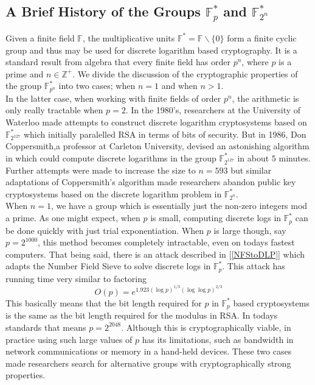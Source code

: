 \subsection{A Brief History of the Groups $\mathbb{F}_p^*$ and $\mathbb{F}_{2^n}^*$}

Given a finite field $\mathbb{F}$, the multiplicative units $\mathbb{F}^* = \mathbb{F} \backslash \lbrace 0 \rbrace $ form a finite cyclic group and thus may be used for discrete logarithm based cryptography. It is a standard result from algebra that every finite field has order $p^n$, where $p$ is a prime and $n \in \mathbb{Z}^+$. We divide the discussion of the cryptographic properties of the group $\mathbb{F}_{p^n}^*$ into two cases; when $n = 1$ and when $n>1$. \\

In the latter case, when working with finite fields of order $p^n$, the arithmetic is only really tractable when $p=2$. In the 1980's, researchers at the University of Waterloo made attempts to construct discrete logarithm cryptosystems based on $\mathbb{F}_{2^{127}}^*$ which initially paralelled RSA in terms of bits of security. But in 1986, Don Coppersmith,a professor at Carleton University, devised an astonishing algorithm in which could compute discrete logarithms in the group $\mathbb{F}_{2^{127}}^*$ in about $5$ minutes. Further attempts were made to increase the size to $n=593$ but similar adaptations of Coppersmith's algorithm made researchers abandon public key cryptosystems based on the discrete logarithm problem in $\mathbb{F}_{2^n}^*$. \\

When $n = 1$, we have a group which is essentially just the non-zero integers mod a prime. As one might expect, when $p$ is small, computing discrete logs in $\mathbb{F}_p^*$ can be done quickly with just trial exponentiation. When $p$ is large though, say $p = 2^{1000}$, this method becomes completely intractable, even on todays fastest computers. That being said, there is an attack described in [\ref{NFStoDLP}] which adapts the Number Field Sieve to solve discrete logs in $\mathbb{F}_p^*$. This attack has running time very similar to factoring $$O(p) = e^{1.923(\log p)^{1/3}(\log\log p)^{2/3}}$$ This basically means that the bit length required for $p$ in $\mathbb{F}_p^*$ based cryptosystems is the same as the bit length required for the modulus in RSA. In todays standards that means $p = 2^{2048}$. Although this is cryptographically viable, in practice using such large values of $p$ has its limitations, such as bandwidth in network communications or memory in a hand-held devices. These two cases made researchers search for alternative groups with cryptographically strong properties. 








